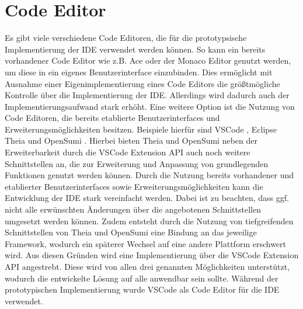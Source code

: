 \section{Code Editor}\label{section:prototypische-implementierung:code-editor}


Es gibt viele verschiedene Code Editoren, die für die prototypsische Implementierung der IDE verwendet werden können. So kann ein bereits vorhandener Code Editor wie z.B. Ace \cite{noauthor_ace_nodate} oder der Monaco Editor \cite{noauthor_monaco_nodate} genutzt werden, um diese in ein eigenes Benutzerinterface einzubinden. Dies ermöglicht mit Ausnahme einer Eigenimplementierung eines Code Editors die größtmögliche Kontrolle über die Implementierung der IDE. Allerdings wird dadurch auch der Implementierungsaufwand stark erhöht. Eine weitere Option ist die Nutzung von Code Editoren, die bereits etablierte Benutzerinterfaces und Erweiterungsmöglichkeiten besitzen. Beispiele hierfür sind \ac{VSCode} \cite{noauthor_vscode_nodate}, Eclipse Theia \cite{noauthor_theia_nodate} und OpenSumi \cite{noauthor_opensumi_nodate}. Hierbei bieten Theia und OpenSumi neben der Erweiterbarkeit durch die VSCode Extension API \cite{noauthor_vscode-extension-api_nodate} auch noch weitere Schnittstellen an, die zur Erweiterung und Anpassung von grundlegenden Funktionen genutzt werden können. Durch die Nutzung bereits vorhandener und etablierter Benutzerinterfaces sowie Erweiterungsmöglichkeiten kann die Entwicklung der IDE stark vereinfacht werden. Dabei ist zu beachten, dass ggf. nicht alle erwünschten Änderungen über die angebotenen Schnittstellen umgesetzt werden können. Zudem entsteht durch die Nutzung von tiefgreifenden Schnittstellen von Theia und OpenSumi eine Bindung an das jeweilige Framework, wodurch ein späterer Wechsel auf eine andere Plattform erschwert wird. Aus diesen Gründen wird eine Implementierung über die VSCode Extension API angestrebt. Diese wird von allen drei genannten Möglichkeiten unterstützt, wodurch die entwickelte Lösung auf alle anwendbar sein sollte. Während der prototypischen Implementierung wurde \ac{VSCode} als Code Editor für die IDE verwendet.